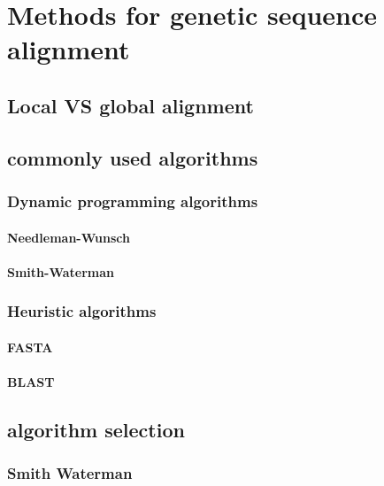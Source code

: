 
\chapter{Methods for genetic sequence alignment}

\section{Local VS global alignment}

\section{commonly used algorithms}

\subsection{Dynamic programming algorithms}
\subsubsection{Needleman-Wunsch}
\subsubsection{Smith-Waterman}

\subsection{Heuristic algorithms}
\subsubsection{FASTA}
\subsubsection{BLAST}

\section{algorithm selection}
 
\subsection{Smith Waterman}